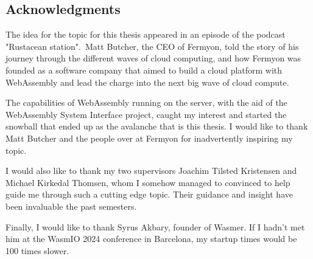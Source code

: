 \documentclass[
  table]{report}
\begin{document}
\newpage

\vspace*{\fill}
\begin{center}
\begin{minipage}{0.75\textwidth}

\chapter*{Acknowledgments}

The idea for the topic for this thesis appeared in an episode of the podcast
"Rustacean station". Matt Butcher, the CEO of Fermyon, told the story of his
journey through the different waves of cloud computing, and how Fermyon was
founded as a software company that aimed to build a cloud platform with
WebAssembly and lead the charge into the next big wave of cloud compute.

\vspace{0.25cm}

The capabilities of WebAssembly running on the server, with the aid of the
WebAssembly System Interface project, caught my interest and started the
snowball that ended up as the avalanche that is this thesis. I would like to
thank Matt Butcher and the people over at Fermyon for inadvertently inspiring my
topic. 

\vspace{0.25cm}

I would also like to thank my two supervisors Joachim Tilsted Kristensen and 
Michael Kirkedal Thomsen, whom I somehow managed to convinced to help guide me 
through such a cutting edge topic. Their guidance and insight have been
invaluable the past semesters. 

\vspace{0.25cm}

Finally, I would like to thank Syrus Akbary, founder of Wasmer. If I hadn't met
him at the WasmIO 2024 conference in Barcelona, my startup times would be 100
times slower.

\end{minipage}
\end{center}
\vspace*{\fill}

\newpage

\tableofcontents

\newpage

\listoffigures

\newpage

\listoftables
\end{document}
